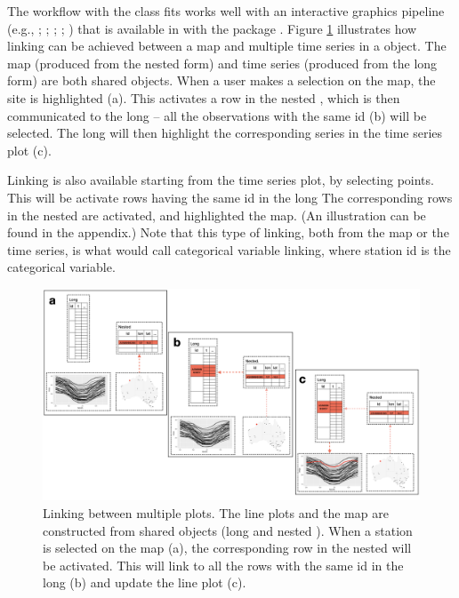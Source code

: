 \documentclass[
  shortnames]{jss}
\begin{document}
The workflow with the  class fits works well with an interactive graphics pipeline (e.g., \citet{buja1988elements}; \citet{buja1996interactive}; \citet{sutherland2000orca}; \citet{xie2014reactive}; \citet{cheng2016enabling}) that is available in  with the package  \citep{crosstalk}. Figure \ref{fig:illu-interactive} illustrates how linking can be achieved between a map and multiple time series in a  object. The map (produced from the nested form) and time series (produced from the long form) are both shared  objects. When a user makes a selection on the map, the site is highlighted (a). This activates a row in the nested , which is then communicated to the long  -- all the observations with the same id (b) will be selected. The long  will then highlight the corresponding series in the time series plot (c).

Linking is also available starting from the time series plot, by selecting points. This will be activate rows having the same id in the long  The corresponding rows in the nested  are activated, and highlighted the map. (An illustration can be found in the appendix.) Note that this type of linking, both from the map or the time series, is what \citet{CS07} would call categorical variable linking, where station id is the categorical variable.

\begin{CodeChunk}
\begin{figure}

{\centering \includegraphics[width=1\linewidth,height=0.35\textheight]{../figures/diagram-keynotes/diagram-keynotes.004} 

}

\caption{Linking between multiple plots. The line plots and the map are constructed from shared  objects (long and nested ). When a station is selected on the map (a), the corresponding row in the nested  will be activated. This will link to all the rows with the same id in the long  (b) and update the line plot (c).}\label{fig:illu-interactive}
\end{figure}
\end{CodeChunk}
\end{document}
